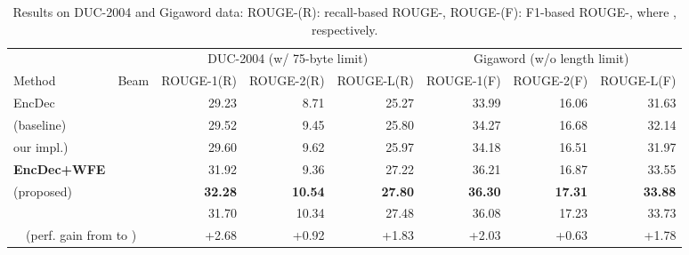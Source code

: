 \documentclass[11pt]{article}
\begin{document}
\begin{table*}[t]
 \small
 \centering
  \tabcolsep=2pt
  \begin{tabular}{ l  l || r | r | r || r | r | r  }
   \hline
   \      &       & \multicolumn{3}{c||}{DUC-2004 (w/ 75-byte limit)}
                  & \multicolumn{3}{c}{Gigaword (w/o length limit)}\\
   Method & Beam & ROUGE-1(R) & ROUGE-2(R) & ROUGE-L(R)  &  ROUGE-1(F) & ROUGE-2(F) & ROUGE-L(F) \\
   \hline
   EncDec                       &    &          29.23  &             8.71  &           25.27 &           33.99  &           16.06  &           31.63\\
   (baseline)                  &    &          29.52  &             9.45  &           25.80 &  34.27  &  16.68  &  32.14\\
   \hspace{1mm}our impl.)       &   & 29.60  &    9.62  &  25.97 &           34.18  &           16.51  &           31.97\\
   \hline
   \bf EncDec+WFE               &    &          31.92  &             9.36  &           27.22 &           36.21  &           16.87  &           33.55\\
   (proposed)                   &    &\bf 32.28 &\bf  10.54  &\bf 27.80 &\bf 36.30  &\bf 17.31  &\bf 33.88\\
   \                            &   &          31.70  &            10.34  &           27.48 &           36.08  &           17.23  &           33.73\\
   \hline
   \hline
   \multicolumn{2}{c|}{ (perf. gain from  to )}
                              &      +2.68 &  +0.92 &   +1.83           &   +2.03 &  +0.63 &   +1.78 \\
   \hline
  \end{tabular}
 \caption{Results on DUC-2004 and Gigaword data: ROUGE-(R): recall-based ROUGE-, ROUGE-(F): F1-based ROUGE-, where , respectively.}
 \label{table:result_duc2004}
\end{table*}
\end{document}
